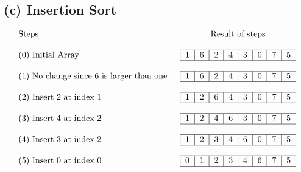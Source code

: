 \documentclass{article}
\begin{document}
\subsection*{(c) Insertion Sort}
\begin{align}
    \begin{tabular}{l c}
        \text{Steps} & \text{Result of steps}\\&\\
        \text{(0) Initial Array\;\;\;\;\;\;\;\;}&\begin{tabular}{|c|c|c|c|c|c|c|c|c|}
            \hline
        1&6&2&4&3&0&7&5\\
            \hline
        \end{tabular}\\&\\
        \text{(1) No change since 6 is larger than one }&\begin{tabular}{|c|c|c|c|c|c|c|c|c|}
            \hline
        1&6&2&4&3&0&7&5\\
            \hline
        \end{tabular}\\&\\
        \text{(2)  Insert 2 at index 1}&\begin{tabular}{|c|c|c|c|c|c|c|c|c|}
            \hline
        1&2&6&4&3&0&7&5\\
            \hline
        \end{tabular}\\&\\
        \text{(3)  Insert 4 at index 2}&\begin{tabular}{|c|c|c|c|c|c|c|c|c|}
            \hline
        1&2&4&6&3&0&7&5\\
            \hline
        \end{tabular}\\&\\
        \text{(4)  Insert 3 at index 2}&\begin{tabular}{|c|c|c|c|c|c|c|c|c|}
            \hline
        1&2&3&4&6&0&7&5\\
            \hline
        \end{tabular}\\&\\
        \text{(5)  Insert 0 at index 0}&\begin{tabular}{|c|c|c|c|c|c|c|c|c|}
            \hline
        0&1&2&3&4&6&7&5\\
            \hline
        \end{tabular}\\&\\

\end{tabular}
\end{align}
\end{document}
